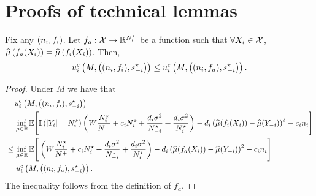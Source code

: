 \section{Proofs of technical lemmas}\label{app:tech}

\begin{lemma}
   \label{lem:NIC-part1} 
   Fix any $(n_i,f_i)$. Let $f_a:\mathcal{X}\rightarrow\mathbb{R}^{N^\star_i}$ be a function such that $\forall X_{i}\in\mathcal{X}$, $\widehat{\mu}\left(f_a(X_{i})\right)=\widehat{\mu}\left(f_i(X_{i})\right)$. Then,
    \begin{align*}
        u^{\rm c}_{i} \left(M, \left((n_i,f_i),s_{-i}^{\star} \right)\right)
        \leq
        u^{\rm c}_{i} \left(M, \left((n_i,f_a),s_{-i}^{\star} \right)\right) .
    \end{align*}
\end{lemma}
\begin{proof}
    Under $M$ we have that 
    \begin{align*}
        &\hspace{0.4cm}
        u^{\rm c}_{i} \left(M, \left((n_i,f_i),s_{-i}^{\star} \right)\right)
        \\
        &=
        \inf_{\mu\in\mathbb{R}}
        \mathbb{E}\Bigg[
            \mathbb{I}\left( \left| Y_i \right| = N^\star_i \right) 
            \left(
                W \frac{N^\star_i}{N^{+}} + c_i N^\star_i  +  \frac{d_i\sigma^2}{N^\star_{-i}} +  \frac{d_i\sigma^2}{ N^\star_i} 
            \right)
            -  d_i\left(
                \widehat{\mu}(f_i(X_{i}))-\widehat{\mu}(Y_{-i})
            \right)^2
            -c_in_i
        \Bigg]
        \\
        &\leq
        \inf_{\mu\in\mathbb{R}}
        \mathbb{E}\Bigg[
            \left(
                W \frac{N^\star_i}{N^{+}} + c_i N^\star_i  +  \frac{d_i\sigma^2}{N^\star_{-i}} +  \frac{d_i\sigma^2}{ N^\star_i} 
            \right)
            -  d_i\left(
                \widehat{\mu}(f_a(X_{i}))-\widehat{\mu}(Y_{-i})
            \right)^2
            -c_in_i
        \Bigg]
        \\
        &=
        u^{\rm c}_{i} \left(M, \left((n_i,f_a),s_{-i}^{\star} \right)\right) .
    \end{align*} 
    The inequality follows from the definition of $f_a$. 
\end{proof}


